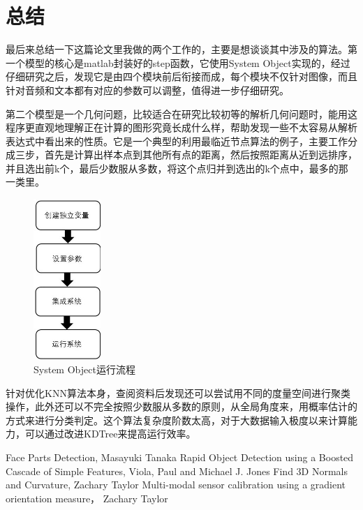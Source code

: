 \documentclass[a4paper, 14pt, twocolumn]{article}
\theoremstyle{definition}
\begin{document}
\section{总结}
最后来总结一下这篇论文里我做的两个工作的，主要是想谈谈其中涉及的算法。第一个模型的核心是matlab封装好的step函数，它使用System Object实现的，经过仔细研究之后，发现它是由四个模块前后衔接而成，每个模块不仅针对图像，而且针对音频和文本都有对应的参数可以调整，值得进一步仔细研究。

第二个模型是一个几何问题，比较适合在研究比较初等的解析几何问题时，能用这程序更直观地理解正在计算的图形究竟长成什么样，帮助发现一些不太容易从解析表达式中看出来的性质。它是一个典型的利用最临近节点算法的例子，主要工作分成三步，首先是计算出样本点到其他所有点的距离，然后按照距离从近到远排序，并且选出前k个，最后少数服从多数，将这个点归并到选出的k个点中，最多的那一类里。

\begin{figure}[H]
\centering
\includegraphics[width=1in]{process.jpg}
\caption{System Object运行流程}
\end{figure}

针对优化KNN算法本身，查阅资料后发现还可以尝试用不同的度量空间进行聚类操作，此外还可以不完全按照少数服从多数的原则，从全局角度来，用概率估计的方式来进行分类判定。这个算法复杂度阶数太高，对于大数据输入极度以来计算能力，可以通过改进KDTree来提高运行效率。
\begin{thebibliography}{99}
	
	Face Parts Detection,  Masayuki Tanaka 
	Rapid Object Detection using a Boosted Cascade of Simple Features, Viola, Paul and Michael J. Jones
	Find 3D Normals and Curvature, Zachary Taylor
	Multi-modal sensor calibration using a gradient orientation measure， Zachary Taylor

\end{thebibliography}
\end{document}
